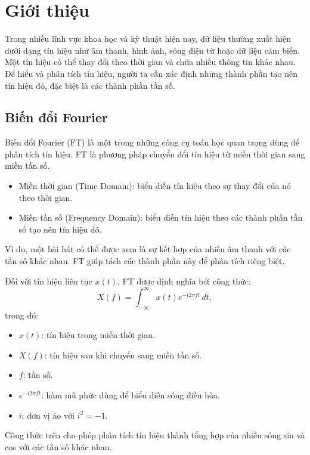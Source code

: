 \section{Giới thiệu}

Trong nhiều lĩnh vực khoa học và kỹ thuật hiện nay, dữ liệu thường xuất hiện
dưới dạng tín hiệu như âm thanh, hình ảnh, sóng điện từ hoặc dữ liệu cảm biến.
Một tín hiệu có thể thay đổi theo thời gian và chứa nhiều thông tin khác nhau.
Để hiểu và phân tích tín hiệu, người ta cần xác định những thành phần tạo nên
tín hiệu đó, đặc biệt là các thành phần tần số.

\subsection{Biến đổi Fourier}

Biến đổi Fourier (FT) là một trong những công cụ toán học quan trọng dùng để
phân tích tín hiệu. FT là phương pháp chuyển đổi tín hiệu từ miền thời gian
sang miền tần số.

\begin{itemize}
    \item Miền thời gian (Time Domain): biểu diễn tín hiệu theo sự thay đổi
    của nó theo thời gian.
    \item Miền tần số (Frequency Domain): biểu diễn tín hiệu theo các thành
    phần tần số tạo nên tín hiệu đó.
\end{itemize}

Ví dụ, một bài hát có thể được xem là sự kết hợp của nhiều âm thanh với các
tần số khác nhau. FT giúp tách các thành phần này để phân tích riêng biệt.

Đối với tín hiệu liên tục $x(t)$, FT được định nghĩa bởi công thức:
\begin{equation}
  X(f) = \int_{-\infty}^{\infty} x(t)e^{-i2\pi ft}\,dt,
\end{equation}
trong đó:
\begin{itemize}
    \item $x(t)$: tín hiệu trong miền thời gian.
    \item $X(f)$: tín hiệu sau khi chuyển sang miền tần số.
    \item $f$: tần số.
    \item $e^{-i2\pi ft}$: hàm mũ phức dùng để biểu diễn sóng điều hòa.
    \item $i$: đơn vị ảo với $i^2 = -1$.
\end{itemize}
Công thức trên cho phép phân tích tín hiệu thành tổng hợp của nhiều sóng sin
và cos với các tần số khác nhau.

